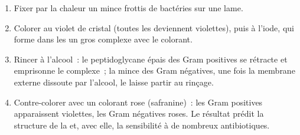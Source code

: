 \begin{method}\label{met:b1:cell-unit-of-life:gram}
\begin{enumerate}
  \item Fixer par la chaleur un mince frottis de bactéries sur une lame.
  \item Colorer au violet de cristal (toutes les  deviennent
        violettes), puis à l'iode, qui forme dans les  un gros
        complexe avec le colorant.
  \item Rincer à l'alcool~: le peptidoglycane épais des  Gram
        positives se rétracte et emprisonne le complexe~; la  mince
        des  Gram négatives, une fois la membrane externe
        dissoute par l'alcool, le laisse partir au rinçage.
  \item Contre-colorer avec un colorant rose (safranine)~: les 
        Gram positives apparaissent violettes, les Gram négatives roses.
        Le résultat prédit la structure de la  et, avec elle, la
        sensibilité à de nombreux antibiotiques.
\end{enumerate}
\end{method}

